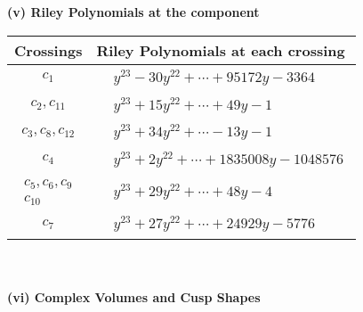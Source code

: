 \documentclass[1p]{elsarticle_modified}
\theoremstyle{definition}
\begin{document}
\newpage\renewcommand{\arraystretch}{1}
\flushleft \textbf{(v) Riley Polynomials at the component}\newline \\
\begin{tabular}{m{50pt}|m{274pt}}
Crossings & \hspace{64pt}Riley Polynomials at each crossing \\
\hline $$\begin{aligned}c_{1}\end{aligned}$$&$\begin{aligned}
&y^{23}-30 y^{22}+\cdots+95172 y-3364
\end{aligned}$\\
\hline $$\begin{aligned}c_{2},c_{11}\end{aligned}$$&$\begin{aligned}
&y^{23}+15 y^{22}+\cdots+49 y-1
\end{aligned}$\\
\hline $$\begin{aligned}c_{3},c_{8},c_{12}\end{aligned}$$&$\begin{aligned}
&y^{23}+34 y^{22}+\cdots-13 y-1
\end{aligned}$\\
\hline $$\begin{aligned}c_{4}\end{aligned}$$&$\begin{aligned}
&y^{23}+2 y^{22}+\cdots+1835008 y-1048576
\end{aligned}$\\
\hline $$\begin{aligned}c_{5},c_{6},c_{9}\\c_{10}\end{aligned}$$&$\begin{aligned}
&y^{23}+29 y^{22}+\cdots+48 y-4
\end{aligned}$\\
\hline $$\begin{aligned}c_{7}\end{aligned}$$&$\begin{aligned}
&y^{23}+27 y^{22}+\cdots+24929 y-5776
\end{aligned}$\\
\hline
\end{tabular}\\~\\
\newpage\flushleft \textbf{(vi) Complex Volumes and Cusp Shapes}
\end{document}
